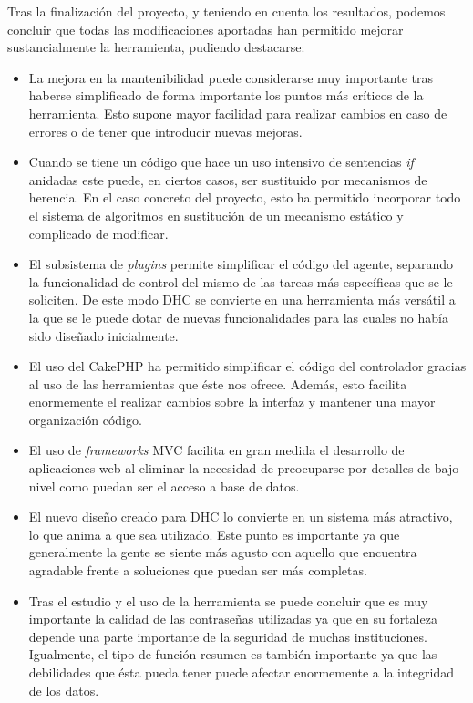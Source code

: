 Tras la finalización del proyecto, y teniendo en cuenta los resultados, podemos concluir que todas las modificaciones aportadas han permitido mejorar sustancialmente la herramienta, pudiendo destacarse:

\begin{itemize}
	\item La mejora en la mantenibilidad puede considerarse muy importante tras haberse simplificado de forma importante los puntos más críticos de la herramienta. Esto supone mayor facilidad para realizar cambios en caso de errores o de tener que introducir nuevas mejoras.
	
	\item Cuando se tiene un código que hace un uso intensivo de sentencias \emph{if} anidadas este puede, en ciertos casos, ser sustituido por mecanismos de herencia. En el caso concreto del proyecto, esto ha permitido incorporar todo el sistema de algoritmos en sustitución de un mecanismo estático y complicado de modificar.
	
	\item El subsistema de \emph{plugins} permite simplificar el código del agente, separando la funcionalidad de control del mismo de las tareas más específicas que se le soliciten. De este modo DHC se convierte en una herramienta más versátil a la que se le puede dotar de nuevas funcionalidades para las cuales no había sido diseñado inicialmente.
	
	\item El uso del CakePHP ha permitido simplificar el código del controlador gracias al uso de las herramientas que éste nos ofrece. Además, esto facilita enormemente el realizar cambios sobre la interfaz y mantener una mayor organización código.
	
	\item El uso de \emph{frameworks} MVC facilita en gran medida el desarrollo de aplicaciones web al eliminar la necesidad de preocuparse por detalles de bajo nivel como puedan ser el acceso a base de datos.

	\item El nuevo diseño creado para DHC lo convierte en un sistema más atractivo, lo que anima a que sea utilizado. Este punto es importante ya que generalmente la gente se siente más agusto con aquello que encuentra agradable frente a soluciones que puedan ser más completas.
	
	\item Tras el estudio y el uso de la herramienta se puede concluir que es muy importante la calidad de las contraseñas utilizadas ya que en su fortaleza depende una parte importante de la seguridad de muchas instituciones. Igualmente, el tipo de función resumen es también importante ya que las debilidades que ésta pueda tener puede afectar enormemente a la integridad de los datos.
		

\end{itemize}

